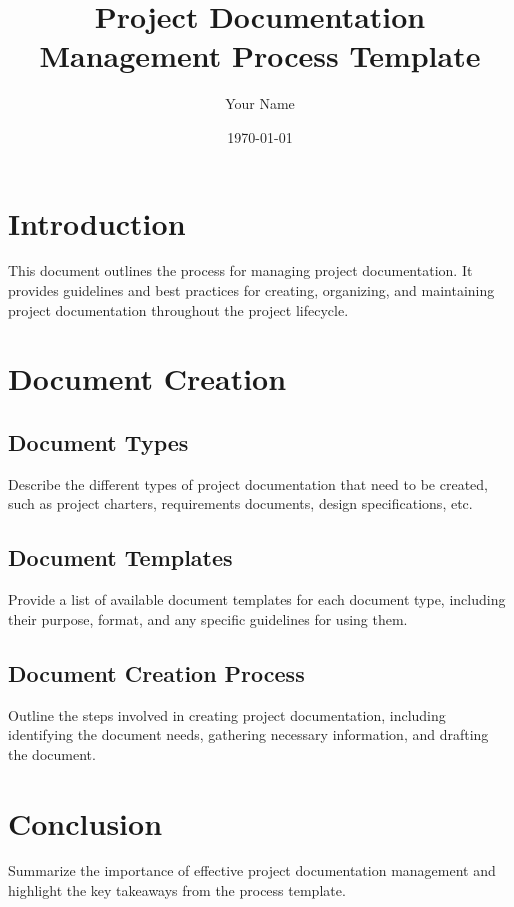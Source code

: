 \documentclass{article}
\begin{document}
\title{\textbf{Project Documentation Management Process Template}}
\author{Your Name}
\date{\today}
\maketitle

\tableofcontents
\newpage

\section{Introduction}
This document outlines the process for managing project documentation. It provides guidelines and best practices for creating, organizing, and maintaining project documentation throughout the project lifecycle.

\section{Document Creation}
\subsection{Document Types}
Describe the different types of project documentation that need to be created, such as project charters, requirements documents, design specifications, etc.

\subsection{Document Templates}
Provide a list of available document templates for each document type, including their purpose, format, and any specific guidelines for using them.

\subsection{Document Creation Process}
Outline the steps involved in creating project documentation, including identifying the document needs, gathering necessary information, and drafting the document.


\section{Conclusion}
Summarize the importance of effective project documentation management and highlight the key takeaways from the process template.


\end{document}
